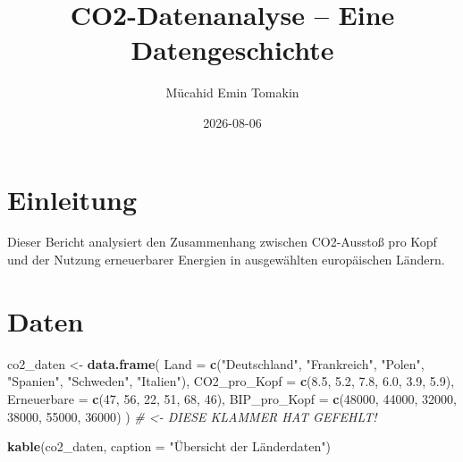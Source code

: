 \documentclass[
]{article}
\title{CO2-Datenanalyse -- Eine Datengeschichte}
\author{Mücahid Emin Tomakin}
\date{2026-08-06}
\newenvironment{Shaded}{\begin{snugshade}}{\end{snugshade}}
\newcommand{\AttributeTok}[1]{\textcolor[rgb]{0.13,0.29,0.53}{#1}}
\newcommand{\CommentTok}[1]{\textcolor[rgb]{0.56,0.35,0.01}{\textit{#1}}}
\newcommand{\DecValTok}[1]{\textcolor[rgb]{0.00,0.00,0.81}{#1}}
\newcommand{\FloatTok}[1]{\textcolor[rgb]{0.00,0.00,0.81}{#1}}
\newcommand{\FunctionTok}[1]{\textcolor[rgb]{0.13,0.29,0.53}{\textbf{#1}}}
\newcommand{\NormalTok}[1]{#1}
\newcommand{\OtherTok}[1]{\textcolor[rgb]{0.56,0.35,0.01}{#1}}
\newcommand{\StringTok}[1]{\textcolor[rgb]{0.31,0.60,0.02}{#1}}
\begin{document}
\maketitle

{
\setcounter{tocdepth}{2}
\tableofcontents
}
\section{Einleitung}\label{einleitung}

Dieser Bericht analysiert den Zusammenhang zwischen CO2-Ausstoß pro Kopf
und der Nutzung erneuerbarer Energien in ausgewählten europäischen
Ländern.

\section{Daten}\label{daten}

\begin{Shaded}
\begin{Highlighting}[]
\NormalTok{co2\_daten }\OtherTok{\textless{}{-}} \FunctionTok{data.frame}\NormalTok{(}
  \AttributeTok{Land =} \FunctionTok{c}\NormalTok{(}\StringTok{"Deutschland"}\NormalTok{, }\StringTok{"Frankreich"}\NormalTok{, }\StringTok{"Polen"}\NormalTok{, }\StringTok{"Spanien"}\NormalTok{, }\StringTok{"Schweden"}\NormalTok{, }\StringTok{"Italien"}\NormalTok{),}
  \AttributeTok{CO2\_pro\_Kopf =} \FunctionTok{c}\NormalTok{(}\FloatTok{8.5}\NormalTok{, }\FloatTok{5.2}\NormalTok{, }\FloatTok{7.8}\NormalTok{, }\FloatTok{6.0}\NormalTok{, }\FloatTok{3.9}\NormalTok{, }\FloatTok{5.9}\NormalTok{),}
  \AttributeTok{Erneuerbare =} \FunctionTok{c}\NormalTok{(}\DecValTok{47}\NormalTok{, }\DecValTok{56}\NormalTok{, }\DecValTok{22}\NormalTok{, }\DecValTok{51}\NormalTok{, }\DecValTok{68}\NormalTok{, }\DecValTok{46}\NormalTok{),}
  \AttributeTok{BIP\_pro\_Kopf =} \FunctionTok{c}\NormalTok{(}\DecValTok{48000}\NormalTok{, }\DecValTok{44000}\NormalTok{, }\DecValTok{32000}\NormalTok{, }\DecValTok{38000}\NormalTok{, }\DecValTok{55000}\NormalTok{, }\DecValTok{36000}\NormalTok{)}
\NormalTok{)  }\CommentTok{\# \textless{}{-} DIESE KLAMMER HAT GEFEHLT!}

\FunctionTok{kable}\NormalTok{(co2\_daten, }\AttributeTok{caption =} \StringTok{"Übersicht der Länderdaten"}\NormalTok{)}
\end{Highlighting}
\end{Shaded}
\end{document}
